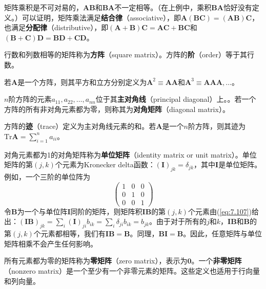     矩阵乘积是不可对易的，$\mathbf{A}\mathbf{B}$和$\mathbf{B}\mathbf{A}$不一定相等。（在上例中，乘积$\mathbf{B}\mathbf{A}$恰好没有定义。）可以证明，矩阵乘法满足\textbf{结合律}（associative），即$\mathbf{A}\left(\mathbf{B}\mathbf{C}\right) = \left(\mathbf{A}\mathbf{B}\right)\mathbf{C}$，也满足\textbf{分配律}（distributive），即$\left(\mathbf{A} + \mathbf{B}\right)\mathbf{C} = \mathbf{A}\mathbf{C} + \mathbf{B}\mathbf{C}$和$\left(\mathbf{B} + \mathbf{C}\right)\mathbf{D} = \mathbf{B}\mathbf{D} + \mathbf{C}\mathbf{D}$。

    行数和列数相等的矩阵称为\textbf{方阵}（square matrix）。方阵的\textbf{阶}（order）等于其行数。

    若$\mathbf{A}$是一个方阵，则其平方和立方分别定义为$\mathbf{A}^2 \equiv \mathbf{A}\mathbf{A}$和$\mathbf{A}^3 \equiv \mathbf{A}\mathbf{A}\mathbf{A},\ldots$。

    $n$阶方阵的元素$a_{11},a_{22},\ldots,a_{nn}$位于其\textbf{主对角线}（principal diagonal）上。。若一个方阵的所有非对角元素都为零，则称其为\textbf{对角矩阵}（diagonal matrix）。

    方阵的\textbf{迹}（trace）定义为主对角线元素的和。若$\mathbf{A}$是一个$n$阶方阵，则其迹为$\mathrm{Tr} \mathbf{A} = \sum_{i=1}^{n}a_{ii}$。

    对角元素都为1的对角矩阵称为\textbf{单位矩阵}（identity matrix or unit matrix）。单位矩阵的第$\left(j,k\right)$个元素为Kronecker delta函数：$\left(\mathbf{I}\right)_{jk} = \delta_{jk}$，其中$\mathbf{I}$是单位矩阵。例如，一个三阶的单位阵为
    \begin{equation*}
        \begin{pmatrix}
            1 & 0 & 0 \\
            0 & 1 & 0 \\
            0 & 0 & 1
        \end{pmatrix}
    \end{equation*}
    令$\mathbf{B}$为一个与单位阵$\mathbf{I}$同阶的矩阵，则矩阵积$\mathbf{IB}$的第$\left(j,k\right)$个元素由(\ref{eq:7.107})给出：$\left(\mathbf{IB}\right)_{jk} = \sum_{i}\left(\mathbf{I}\right)_{ji}b_{ik} = \sum_{i}\delta_{ji}b_{ik} = b_{jk}$。由于对于所有的$j$和$k$，$\mathbf{IB}$和$\mathbf{B}$的第$\left(j,k\right)$个元素都相等，我们有$\mathbf{IB} = \mathbf{B}$。同理，$\mathbf{BI} = \mathbf{B}$。因此，任意矩阵与单位矩阵相乘不会产生任何影响。

    所有元素都为零的矩阵称为\textbf{零矩阵}（zero matrix），表示为$\mathbf{0}$。一个\textbf{非零矩阵}（nonzero matrix）是一个至少有一个非零元素的矩阵。这些定义也适用于行向量和列向量。

